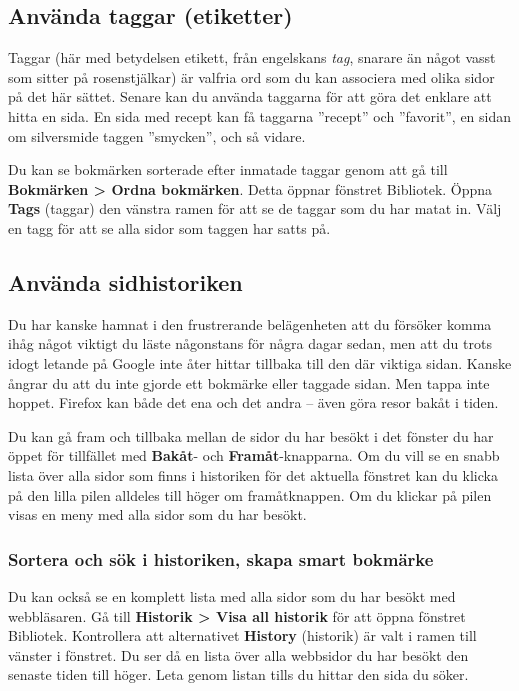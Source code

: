 \documentclass[a4paper,final]{memoir} %
\begin{document}
\subsection{Använda taggar (etiketter)}\label{firefox-taggar}

Taggar (här med betydelsen etikett, från engelskans \textit{tag}, snarare än något vasst som sitter på rosenstjälkar) är valfria ord som du kan associera med olika sidor på det här sättet. Senare kan du använda taggarna för att göra det enklare att hitta en sida. En sida med recept kan få taggarna ''recept'' och ''favorit'', en sidan om silversmide taggen ''smycken'', och så vidare. 

Du kan se bokmärken sorterade efter inmatade taggar genom att gå till \textbf{Bokmärken \textgreater{} Ordna bokmärken}. Detta öppnar fönstret Bibliotek. Öppna \textbf{Tags} (taggar) den vänstra ramen för att se de taggar som du har matat in. Välj en tagg för att se alla sidor som taggen har satts på.

\subsection{Använda sidhistoriken}


Du har kanske hamnat i den frustrerande belägenheten att du försöker komma ihåg något viktigt du läste någonstans för några dagar sedan, men att du trots idogt letande på Google inte åter hittar tillbaka till den där viktiga sidan. Kanske ångrar du att du inte gjorde ett bokmärke eller taggade sidan. Men tappa inte hoppet. Firefox kan både det ena och det andra -- även göra resor bakåt i tiden.

Du kan gå fram och tillbaka mellan de sidor du har besökt i det fönster du har öppet för tillfället med \textbf{Bakåt}- och \textbf{Framåt}-knapparna. Om du vill se en snabb lista över alla sidor som finns i historiken för det aktuella fönstret kan du klicka på den lilla pilen alldeles till höger om framåtknappen. Om du klickar på pilen visas en meny med alla sidor som du har besökt.

\subsubsection{Sortera och sök i historiken, skapa smart bokmärke}

Du kan också se en komplett lista med alla sidor som du har besökt med webbläsaren. Gå till \textbf{Historik \textgreater{} Visa all historik} för att öppna fönstret Bibliotek. Kontrollera att alternativet \textbf{History} (historik) är valt i ramen till vänster i fönstret. Du ser då en lista över alla webbsidor du har besökt den senaste tiden till höger. Leta genom listan tills du hittar den sida du söker. 
\end{document}
